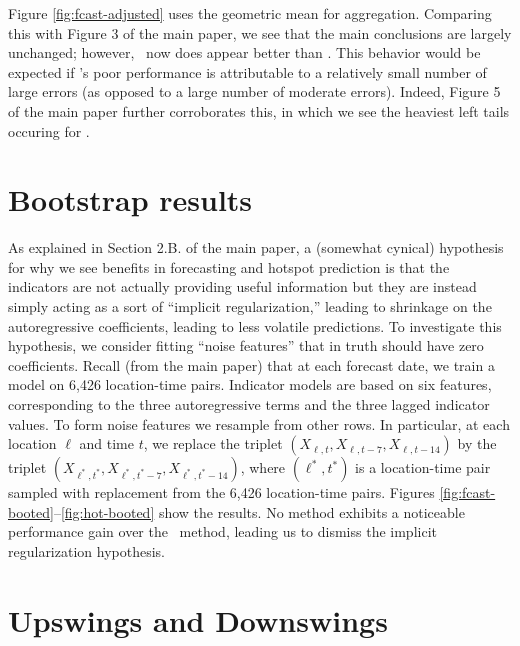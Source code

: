 Figure \ref{fig:fcast-adjusted} uses the geometric
mean for aggregation.  Comparing this with Figure 3 of the main paper,
we see that the main conclusions are largely unchanged; however,
\chngcli~now does appear better than \ar.  This behavior would be
expected if \chngcli's poor performance is attributable to a
relatively small number of large errors (as opposed to a large number
of moderate errors).  Indeed, Figure 5 of the main paper further
corroborates this, in which we see the heaviest left tails occuring
for \chngcli.

\section{Bootstrap results}

As explained in Section 2.B. of the main paper, a (somewhat cynical)
hypothesis for why we see benefits in forecasting and hotspot
prediction is that the indicators are not actually providing useful
information but they are instead simply acting as a sort of ``implicit
regularization,''  leading to shrinkage on the autoregressive
coefficients, leading to less volatile predictions.  To investigate
this hypothesis, we consider fitting  ``noise features'' that in truth
should have zero coefficients.  Recall (from the main paper) that at each forecast date, we
train a model on 6,426 location-time pairs.  Indicator models are
based on six features, corresponding to the three autoregressive terms
and the three lagged indicator values.  To form noise features
we resample from other rows.  In particular, at each location $\ell$ and
time $t$, we replace the triplet $(X_{\ell,t}, X_{\ell,t-7},
X_{\ell,t-14})$ by the triplet $(X_{\ell^*,t^*}, X_{\ell^*,t^*-7},
X_{\ell^*,t^*-14})$, where $(\ell^*,t^*)$ is a location-time pair
sampled with replacement from the 6,426 location-time pairs.  Figures
\ref{fig:fcast-booted}--\ref{fig:hot-booted} show the results.  No
method exhibits a noticeable performance gain over the \ar~method,
leading us to dismiss the implicit regularization hypothesis.








\section{Upswings and Downswings}

